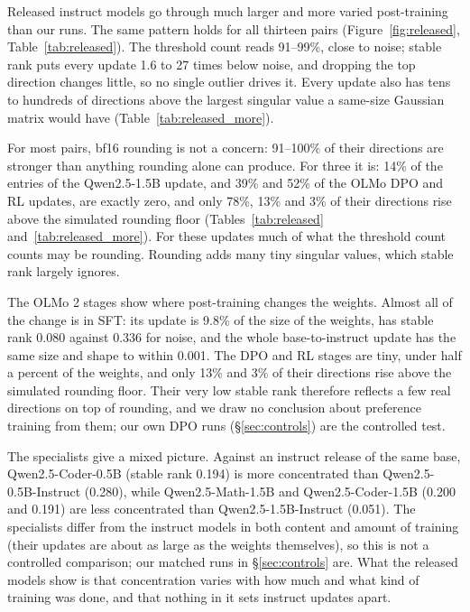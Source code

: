 Released instruct models go through much larger and more varied
post-training than our runs. The same pattern holds for all thirteen pairs
(Figure~\ref{fig:released}, Table~\ref{tab:released}). The threshold count
reads 91--99\%, close to noise; stable rank puts every update 1.6 to 27 times
below noise, and dropping the top direction changes little, so no single
outlier drives it. Every update also has tens to hundreds of directions above
the largest singular value a same-size Gaussian matrix would have
(Table~\ref{tab:released_more}).

For most pairs, bf16 rounding is not a concern: 91--100\% of their
directions are stronger than anything rounding alone can produce. For three
it is: 14\% of the entries of the Qwen2.5-1.5B update, and 39\% and 52\% of
the OLMo DPO and RL updates, are exactly zero, and only 78\%, 13\% and 3\% of
their directions rise above the simulated rounding floor
(Tables~\ref{tab:released} and~\ref{tab:released_more}). For these updates
much of what the threshold
count counts may be rounding. Rounding adds many tiny singular values, which
stable rank largely ignores.

The OLMo 2 stages show where post-training changes the weights. Almost all of
the change is in SFT: its update is 9.8\% of the size of the weights, has
stable rank 0.080 against 0.336 for noise, and the whole base-to-instruct
update has the same size and shape to within 0.001. The DPO and RL stages are
tiny, under half a percent of the weights, and only 13\% and 3\% of their
directions rise above the simulated rounding floor. Their very low stable
rank therefore reflects a few real directions on top of rounding, and we draw
no conclusion about preference training from them; our own DPO runs
(\S\ref{sec:controls}) are the controlled test.

The specialists give a mixed picture. Against an instruct release of the same
base, Qwen2.5-Coder-0.5B (stable rank 0.194) is more concentrated than
Qwen2.5-0.5B-Instruct (0.280), while Qwen2.5-Math-1.5B and
Qwen2.5-Coder-1.5B (0.200 and 0.191) are less concentrated than
Qwen2.5-1.5B-Instruct (0.051). The specialists differ from the instruct models
in both content and amount of training (their updates are about as large as
the weights themselves), so this is not a controlled comparison; our matched
runs in \S\ref{sec:controls} are. What the released models show is that
concentration varies with how much and what kind of training was done, and
that nothing in it sets instruct updates apart.
